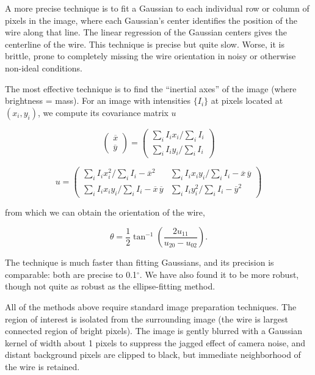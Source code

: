 A more precise technique is to fit a Gaussian to each individual row or column of pixels in the image, where each Gaussian's center identifies the position of the wire along that line. The linear regression of the Gaussian centers gives the centerline of the wire. This technique is precise but quite slow. Worse, it is brittle, prone to completely missing the wire orientation in noisy or otherwise non-ideal conditions.

The most effective technique is to find the ``inertial axes'' of the image (where brightness = mass). For an image with intensities $\{I_i\}$ at pixels located at ${(x_i, y_i)}$, we compute its covariance matrix $u$

\begin{equation}
\left( \begin{array}{c}
\overline{x} \\
\overline{y} \end{array} \right)
= \left( \begin{array}{c}
\sum_{i} I_i x_i / \sum_i I_i \\
\sum_{i} I_i y_i / \sum_i I_i \end{array} \right)
\end{equation}

\begin{equation}
u = \left( \begin{array}{cc}
\sum_{i} I_i x_i^2 / \sum_i I_i - \overline{x}^2 & \sum_{i} I_i x_i y_i / \sum_i I_i - \overline{x}\,\overline{y} \\
\sum_{i} I_i x_i y_i / \sum_i I_i - \overline{x}\,\overline{y} & \sum_{i} I_i y_i^2 / \sum_i I_i - \overline{y}^2\end{array} \right)
\end{equation}

\noindent from which we can obtain the orientation of the wire,

\begin{equation}
\theta = \frac{1}{2}\tan^{-1}\left(\frac{2u_{11}}{u_{20} - u_{02}}\right).
\end{equation}

\noindent The technique is much faster than fitting Gaussians, and its precision is comparable: both are precise to 0.1$^\circ$. We have also found it to be more robust, though not quite as robust as the ellipse-fitting method.

All of the methods above require standard image preparation techniques. The region of interest is isolated from the surrounding image (the wire is largest connected region of bright pixels). The image is gently blurred with a Gaussian kernel of width about 1 pixels to suppress the jagged effect of camera noise, and distant background pixels are clipped to black, but immediate neighborhood of the wire is retained.